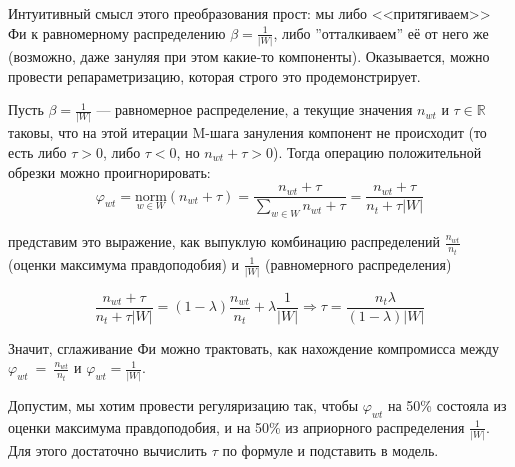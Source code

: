 \documentclass[12pt,twoside]{article}
\begin{document}
	
	Интуитивный смысл этого преобразования прост: мы либо <<притягиваем>> Фи к равномерному распределению $\beta = \frac{1}{|W|}$, либо ”отталкиваем” её от него же (возможно, даже
	зануляя при этом какие-то компоненты).
	Оказывается, можно провести репараметризацию, которая строго это продемонстрирует.
	
	Пусть $\beta = \frac{1}{|W|}$ — равномерное распределение, а текущие значения $n_{wt}$ и $\tau \in \mathbb {R}$ таковы, что на этой итерации M-шага зануления компонент не происходит (то есть либо $\tau > 0$,
	либо $\tau < 0$, но $n_{wt} + \tau > 0$).
	Тогда операцию положительной обрезки можно проигнорировать:
	\begin{equation}
	\varphi_{wt} = \underset{w \in W}{\text{norm}} \left(n_{wt} + \tau \right) = \frac{n_{wt} + \tau}{\sum\limits_{w \in W} n_{wt} + \tau} = \frac{n_{wt} + \tau}{n_{t} + \tau |W|}
	\end{equation}
	
	представим это выражение, как выпуклую комбинацию распределений $\frac{n_{wt}}
	{n_t}$ (оценки максимума правдоподобия) и $\frac{1}{|W|}$ (равномерного распределения)
	
	\begin{equation}
	\frac{n_{wt} + \tau}{n_{t} + \tau |W|} = (1 - \lambda)\frac{n_{wt}}{n_t} + \lambda \frac{1}{|W|} 
	\Rightarrow	
	\tau = \frac{n_t\lambda}{(1 - \lambda)|W|}
	\end{equation}
	
	Значит, сглаживание Фи можно трактовать, как нахождение компромисса между $\varphi_{wt}$~=~$\frac{n_{wt}}
	{n_t}$ и $\varphi_{wt} = \frac{1}{|W|}$.
	
	Допустим, мы хотим провести регуляризацию так, чтобы $\varphi_{wt}$ на 50\% состояла из оценки максимума правдоподобия, и на 50\% из априорного
	распределения $\frac{1}{|W|}$. Для этого достаточно вычислить $\tau$ по формуле и подставить в модель.
	
\end{document}
